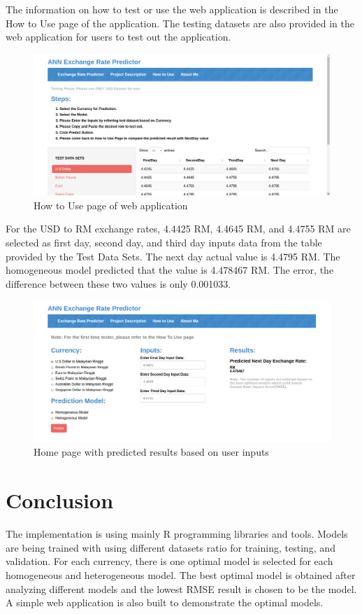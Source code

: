 The information on how to test or use the web application is described in the How to Use page of the application. The testing datasets are also provided in the web application for users to test out the application.
\pagebreak

\begin{figure}[hbt!]\centering
	\includegraphics[width=1.1\textwidth]{how_to_use}
	\caption{How to Use page of web application }
\end{figure}

For the USD to RM exchange rates, 4.4425 RM, 4.4645 RM, and 4.4755 RM are selected as first day, second day, and third day inputs data from the table provided by the Test Data Sets. The  next day actual value is  4.4795 RM. The homogeneous model predicted that the value is 4.478467 RM. The error, the difference between these two values is only 0.001033. 

\begin{figure}[hbt!]\centering
	\includegraphics[width=1.1\textwidth]{tested_main}
	\caption{Home page with predicted results based on user inputs}
\end{figure}
\pagebreak

\section{Conclusion}
The implementation is using mainly R programming libraries and tools. Models are being trained  with using different datasets ratio for training, testing, and validation. For each currency, there is one optimal model is selected for each homogeneous and heterogeneous model. The best optimal model is obtained after analyzing different models and the lowest RMSE result is chosen to be the model. A simple web application is also built to demonstrate the optimal models.